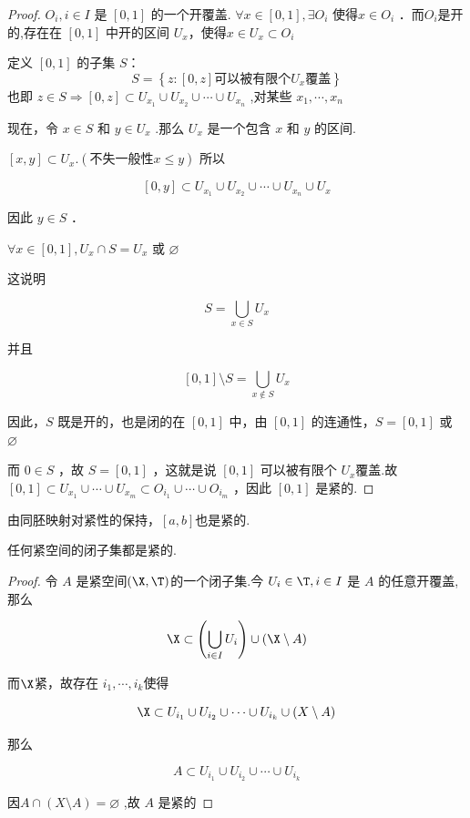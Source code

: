 \begin{proof}
	$O_i, i \in I$ 是 $[0,1]$ 的一个开覆盖. $\forall x \in[0,1], \exists O_i$ 使得$x \in O_i$ ．而$O_i$是开的,存在在 $[0,1]$ 中开的区间 $U_x$，使得$x \in U_x \subset O_i$
	
	定义 $[0,1]$ 的子集 $S$：
	$$S=\left\{z:\left[0, z\right] \textbf{可以被有限个} U_x \textbf{覆盖} \right\}$$
	也即 $z \in S \Rightarrow\left[0, z\right] \subset U_{x_1} \cup U_{x_2} \cup \cdots \cup U_{x_n}$ ,对某些 $x_1, \cdots, x_n$ 
	
	现在，令 $x \in S$ 和 $y \in U_x$ .那么 $U_x$ 是一个包含 $x$ 和 $y$ 的区间.
	
	$[x, y] \subset U_x .(\textbf{不失一般性} x \leqslant y)$ 所以
	
	$$
	[0, y] \subset U_{x_1} \cup U_{x_2} \cup \cdots \cup U_{x_n} \cup U_x
	$$
	
	
	因此 $y \in S$ ．
	
	$
	\forall x \in[0,1], U_x \cap S=U_x \text { 或 } \varnothing
	$
	
	
	这说明
	
	$$
	S=\bigcup_{x \in S} U_x
	$$
	
	
	并且
	
	$$
	[0,1]\setminus S=\bigcup_{x \notin S} U_x
	$$
	
	
	因此，$S$ 既是开的，也是闭的在 $[0,1]$ 中，由 $[0,1]$ 的连通性，$S=[0,1]$ 或 $\varnothing$
	
	而 $0 \in S$ ，故 $S=[0,1]$ ，这就是说 $[0,1]$ 可以被有限个 $U_x$覆盖.故 $[0,1] \subset U_{x_1} \cup \cdots \cup U_{x_m} \subset O_{i_1} \cup \cdots \cup O_{i_m}$ ，因此 $[0,1]$ 是紧的.
	
	
\end{proof}
由同胚映射对紧性的保持，$\left[a,b\right]$也是紧的.
\begin{proposition}
	任何紧空间的闭子集都是紧的.
\end{proposition}
\begin{proof}
	令 $A$ 是紧空间$(\X,\T)$的一个闭子集.今 $U_i \in \T, i \in I$ 是 $A$ 的任意开覆盖,那么
	
	$$
	\X \subset\left(\bigcup_{i \in I} U_i\right) \cup(\X\setminus A)
	$$
	
	
	而$\X$紧，故存在 $i_1, \cdots, i_k $使得
	
	$$
	\X \subset U_{i_1} \cup U_{i_2} \cup \cdots \cup U_{i_k} \cup(X\setminus A)
	$$
	
	
	那么
	
	$$
	A \subset U_{i_1} \cup U_{i_2} \cup \cdots \cup U_{i_k}
	$$
	
	
	因$A \cap(X\setminus A)=\varnothing$ ,故 $A$ 是紧的
\end{proof}
